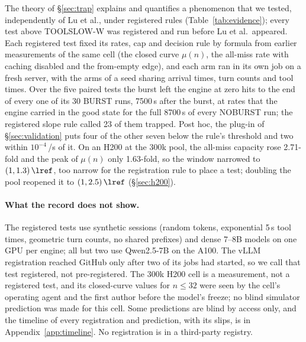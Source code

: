 The theory of \S\ref{sec:trap} explains and quantifies a phenomenon that we tested, independently of Lu et al., under
registered rules (Table~\ref{tab:evidence}); every test above TOOLSLOW-W was registered and run before Lu et al.\ appeared. Each registered test fixed its rates, cap and decision rule by formula from earlier
measurements of the same cell (the closed curve $\mu(n)$, the all-miss rate with caching disabled and the from-empty edge), and
each arm ran in its own job on a fresh server, with the arms of a seed sharing arrival times, turn counts and tool times. Over the
five paired tests the burst left the engine at zero hits to the end of every one of its 30 BURST runs, 7500\,s after the burst, at
rates that the engine carried in the good state for the full 8700\,s of every NOBURST run; the registered slope rule called 23 of
them trapped. Post hoc, the plug-in of \S\ref{sec:validation} puts four of the other seven below the rule's threshold and two
within $10^{-4}$\,/s of it. On an H200 at the 300k pool, the all-miss capacity rose 2.71-fold and
the peak of $\mu(n)$ only 1.63-fold, so the window narrowed to $(1,1.3)\,\lref$, too narrow for the registration rule to place a
test; doubling the pool reopened it to $(1,2.5)\,\lref$ (\S\ref{sec:h200}).

\paragraph{What the record does not show.} The registered tests use synthetic sessions (random tokens, exponential 5\,s tool
times, geometric turn counts, no shared prefixes) and dense 7--8B models on one GPU per engine; all but two use Qwen2.5-7B on the
A100. The vLLM registration reached GitHub only after two of its jobs had started, so we call that test registered, not
pre-registered. The 300k H200 cell is a measurement, not a registered test, and its closed-curve values for $n\le32$ were seen by
the cell's operating agent and the first author before the model's freeze; no blind simulator prediction was made for this cell. Some predictions are blind by access only, and the timeline of every registration and
prediction, with its slips, is in Appendix~\ref{app:timeline}. No registration is in a third-party registry.
